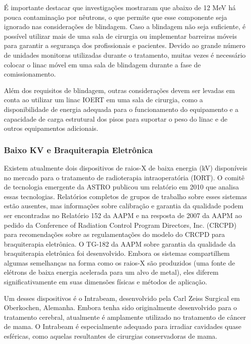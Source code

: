 \documentclass[11pt,a4paper]{article}
\begin{document}
	É importante destacar que investigações mostraram que abaixo de 12 MeV há pouca contaminação por nêutrons, o que permite que esse componente seja ignorado nas considerações de blindagem. Caso a blindagem não seja suficiente, é possível utilizar mais de uma sala de cirurgia ou implementar barreiras móveis para garantir a segurança dos profissionais e pacientes. Devido ao grande número de unidades monitoras utilizadas durante o tratamento, muitas vezes é necessário colocar o linac móvel em uma sala de blindagem durante a fase de comissionamento.

	Além dos requisitos de blindagem, outras considerações devem ser levadas em conta ao utilizar um linac IOERT em uma sala de cirurgia, como a disponibilidade de energia adequada para o funcionamento do equipamento e a capacidade de carga estrutural dos pisos para suportar o peso do linac e de outros equipamentos adicionais.


\subsubsection*{Baixo KV e Braquiterapia Eletrônica}

	Existem atualmente dois dispositivos de raios-X de baixa energia (kV) disponíveis no mercado para o tratamento de radioterapia intraoperatória (IORT). O comitê de tecnologia emergente da ASTRO publicou um relatório em 2010 que analisa essas tecnologias. Relatórios completos de grupos de trabalho sobre esses sistemas estão ausentes, mas informações sobre calibração e garantia da qualidade podem ser encontradas no Relatório 152 da AAPM e na resposta de 2007 da AAPM ao pedido da Conference of Radiation Control Program Directors, Inc. (CRCPD) para recomendações sobre as regulamentações do modelo do CRCPD para braquiterapia eletrônica. O TG-182 da AAPM sobre garantia da qualidade da braquiterapia eletrônica foi desenvolvido. Embora os sistemas compartilhem algumas semelhanças na forma como os raios-X são produzidos (uma fonte de elétrons de baixa energia acelerada para um alvo de metal), eles diferem significativamente em suas dimensões físicas e métodos de aplicação.
	
	
	Um desses dispositivos é o Intrabeam, desenvolvido pela Carl Zeiss Surgical em Oberkochen, Alemanha. Embora tenha sido originalmente desenvolvido para o tratamento cerebral, atualmente é amplamente utilizado no tratamento de câncer de mama. O Intrabeam é especialmente adequado para irradiar cavidades quase esféricas, como aquelas resultantes de cirurgias conservadoras de mama.
\end{document}
